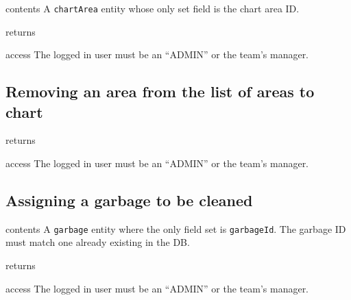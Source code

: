 \begin{apidata}{contents}
  A \texttt{chartArea} entity whose only set field is the chart area ID.
\end{apidata}
\begin{apidata}{returns}
  \begin{datalist}
  \end{datalist}
\end{apidata}
\begin{apidata}{access}
The logged in user must be an ``ADMIN'' or the team's manager.
\end{apidata}


\subsection{Removing an area from the list of areas to chart}

\begin{apidata}{returns}
  \begin{datalist}
  \end{datalist}
\end{apidata}
\begin{apidata}{access}
The logged in user must be an ``ADMIN'' or the team's manager.
\end{apidata}


\subsection{Assigning a garbage to be cleaned}

\begin{apidata}{contents}
    A \texttt{garbage} entity where the only field set is \texttt{garbageId}.
    The garbage ID must match one already existing in the DB.
\end{apidata}
\begin{apidata}{returns}
  \begin{datalist}
  \end{datalist}
\end{apidata}
\begin{apidata}{access}
The logged in user must be an ``ADMIN'' or the team's manager.
\end{apidata}

